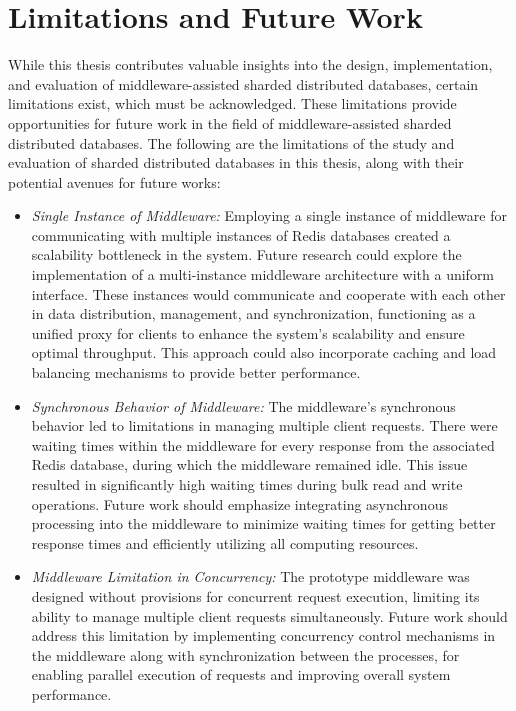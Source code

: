 \section{Limitations and Future Work}
While this thesis contributes valuable insights into the design, implementation, and evaluation of middleware-assisted sharded distributed databases, certain limitations exist, which must be acknowledged. These limitations provide opportunities for future work in the field of middleware-assisted sharded distributed databases. The following are the limitations of the study and evaluation of sharded distributed databases in this thesis, along with their potential avenues for future works: 

\begin{itemize}

\item []{\textit{Single Instance of Middleware:}} Employing a single instance of middleware for communicating with multiple instances of Redis databases created a scalability bottleneck in the system. Future research could explore the implementation of a multi-instance middleware architecture with a uniform interface. These instances would communicate and cooperate with each other in data distribution, management, and synchronization, functioning as a unified proxy for clients to enhance the system's scalability and ensure optimal throughput. This approach could also incorporate caching and load balancing mechanisms to provide better performance.

\item []{\textit{Synchronous Behavior of Middleware:}} The middleware's synchronous behavior led to limitations in managing multiple client requests. There were waiting times within the middleware for every response from the associated Redis database, during which the middleware remained idle. This issue resulted in significantly high waiting times during bulk read and write operations. Future work should emphasize integrating asynchronous processing into the middleware to minimize waiting times for getting better response times and efficiently utilizing all computing resources.

\item []{\textit{Middleware Limitation in Concurrency:}} The prototype middleware was designed without provisions for concurrent request execution, limiting its ability to manage multiple client requests simultaneously. Future work should address this limitation by implementing concurrency control mechanisms in the middleware along with synchronization between the processes, for enabling parallel execution of requests and improving overall system performance.


\end{itemize}
